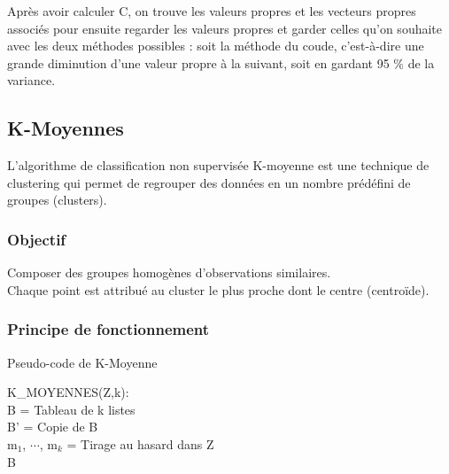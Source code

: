 \documentclass[a4paper,12pt]{article}
\begin{document}
Après avoir calculer C, on trouve les valeurs propres et les vecteurs propres associés pour ensuite regarder les valeurs propres et garder celles qu'on souhaite avec les deux méthodes possibles : soit la méthode du coude, c'est-à-dire une grande diminution d'une valeur propre à la suivant, soit en gardant 95 \% de la variance.


\subsection{K-Moyennes}
L'algorithme de classification non supervisée K-moyenne est une technique de clustering qui permet de regrouper des données en un nombre prédéfini de groupes (clusters).

\subsubsection{Objectif}
Composer des groupes homogènes d'observations similaires.\\

Chaque point est attribué au cluster le plus proche dont le centre (centroïde).

\subsubsection{Principe de fonctionnement}

\begin{algorithm}
  \caption{Pseudo-code de K-Moyenne}
  K\_MOYENNES(Z,k):\\
  B = Tableau de k listes  \\
  B' = Copie de B\\
  m$_1$, $\cdots$, m$_k$ = Tirage au hasard dans Z\\
  \Return B
\end{algorithm}
\end{document}
